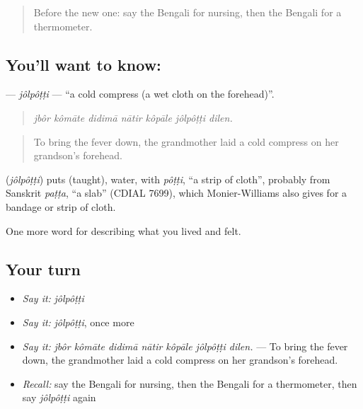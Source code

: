 \begin{quote}
Before the new one: say the Bengali for nursing, then the Bengali for a thermometer.
\end{quote}

\subsection*{You'll want to know: }
\textbf{} — \emph{jôlpôṭṭi} — \textquotedblleft{}a cold compress (a wet cloth on the forehead)\textquotedblright{}.

\begin{quote}
      
\end{quote}

\begin{quote}
\emph{jbôr kômāte didimā nātir kôpāle jôlpôṭṭi dilen.}
\end{quote}

\begin{quote}
To bring the fever down, the grandmother laid a cold compress on her grandson's forehead.
\end{quote}

\begin{cousinweb}
\textbf{} (\emph{jôlpôṭṭi}) puts  (taught), water, with \emph{pôṭṭi}, \textquotedblleft{}a strip of cloth\textquotedblright{}, probably from Sanskrit \emph{paṭṭa}, \textquotedblleft{}a slab\textquotedblright{} (CDIAL 7699), which Monier-Williams also gives for a bandage or strip of cloth.
\end{cousinweb}

\begin{grammarlens}[title={What you've built}]
One more word for describing what you lived and felt.
\end{grammarlens}

\subsection*{Your turn}
\begin{itemize}
\raggedright
  \item \emph{Say it:} \emph{jôlpôṭṭi}
  \item \emph{Say it:} \emph{jôlpôṭṭi}, once more
  \item \emph{Say it:} \emph{jbôr kômāte didimā nātir kôpāle jôlpôṭṭi dilen.} — To bring the fever down, the grandmother laid a cold compress on her grandson's forehead.
  \item \emph{Recall:} say the Bengali for nursing, then the Bengali for a thermometer, then say \emph{jôlpôṭṭi} again
\end{itemize}

